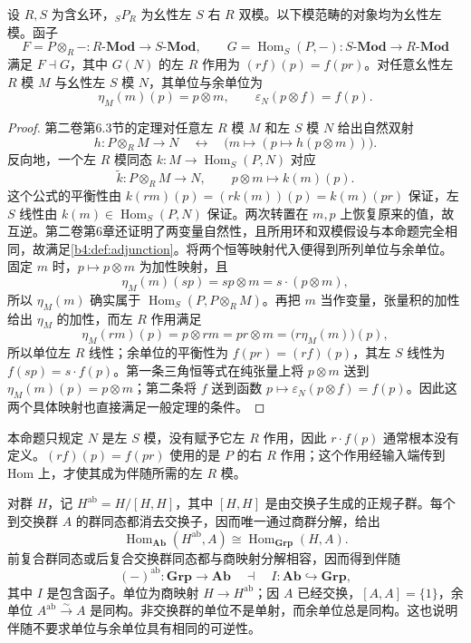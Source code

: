 \begin{proposition}\label{b4:prop:hom-tensor-adjunction}
	设 \(R,S\) 为含幺环，\({}_SP_R\) 为幺性左 \(S\) 右 \(R\) 双模。以下模范畴的对象均为幺性左模。函子
	\[
		F=P\otimes_R-:R\text{-}\mathbf{Mod}\longrightarrow S\text{-}\mathbf{Mod}, \qquad G=\operatorname{Hom}_S(P,-):S\text{-}\mathbf{Mod}\longrightarrow R\text{-}\mathbf{Mod}
	\]
	满足 \(F\dashv G\)，其中 \(G(N)\) 的左 \(R\) 作用为 \((rf)(p)=f(pr)\)。对任意幺性左 \(R\) 模 \(M\) 与幺性左 \(S\) 模 \(N\)，其单位与余单位为
	\[
		\eta_M(m)(p)=p\otimes m, \qquad \varepsilon_N(p\otimes f)=f(p).
	\]
\end{proposition}
\begin{proof}
	第二卷第6.3节的定理对任意左 \(R\) 模 \(M\) 和左 \(S\) 模 \(N\) 给出自然双射
	\[
		h:P\otimes_RM\rightarrow N \quad\longleftrightarrow\quad \bigl(m\mapsto(p\mapsto h(p\otimes m))\bigr).
	\]
	反向地，一个左 \(R\) 模同态 \(k:M\rightarrow\operatorname{Hom}_S(P,N)\) 对应
	\[
		\widetilde k:P\otimes_RM\longrightarrow N, \qquad p\otimes m\longmapsto k(m)(p).
	\]
	这个公式的平衡性由 \(k(rm)(p)=(rk(m))(p)=k(m)(pr)\) 保证，左 \(S\) 线性由 \(k(m)\in\operatorname{Hom}_S(P,N)\) 保证。两次转置在 \(m,p\) 上恢复原来的值，故互逆。第二卷第6章还证明了两变量自然性，且所用环和双模假设与本命题完全相同，故满足\cref{b4:def:adjunction}。将两个恒等映射代入便得到所列单位与余单位。固定 \(m\) 时，\(p\mapsto p\otimes m\) 为加性映射，且
	\[
		\eta_M(m)(sp)=sp\otimes m=s\cdot(p\otimes m),
	\]
	所以 \(\eta_M(m)\) 确实属于 \(\operatorname{Hom}_S(P,P\otimes_RM)\)。再把 \(m\) 当作变量，张量积的加性给出 \(\eta_M\) 的加性，而左 \(R\) 作用满足
	\[
		\eta_M(rm)(p)=p\otimes rm=pr\otimes m =\bigl(r\eta_M(m)\bigr)(p),
	\]
	所以单位左 \(R\) 线性；余单位的平衡性为 \(f(pr)=(rf)(p)\)，其左 \(S\) 线性为 \(f(sp)=s\cdot f(p)\)。第一条三角恒等式在纯张量上将 \(p\otimes m\) 送到 \(\eta_M(m)(p)=p\otimes m\)；第二条将 \(f\) 送到函数 \(p\mapsto\varepsilon_N(p\otimes f)=f(p)\)。因此这两个具体映射也直接满足一般定理的条件。
\end{proof}

本命题只规定 \(N\) 是左 \(S\) 模，没有赋予它左 \(R\) 作用，因此 \(r\cdot f(p)\) 通常根本没有定义。\((rf)(p)=f(pr)\) 使用的是 \(P\) 的右 \(R\) 作用；这个作用经输入端传到 Hom 上，才使其成为伴随所需的左 \(R\) 模。

\begin{example}[交换化与包含函子]\label{b4:exm:abelianization-adjunction}
	对群 \(H\)，记 \(H^{\mathrm{ab}}=H/[H,H]\)，其中 \([H,H]\) 是由交换子生成的正规子群。每个到交换群 \(A\) 的群同态都消去交换子，因而唯一通过商群分解，给出
	\[
		\operatorname{Hom}_{\mathbf{Ab}}(H^{\mathrm{ab}},A) \cong\operatorname{Hom}_{\mathbf{Grp}}(H,A).
	\]
	前复合群同态或后复合交换群同态都与商映射分解相容，因而得到伴随
	\[
		(-)^{\mathrm{ab}}:\mathbf{Grp}\longrightarrow\mathbf{Ab} \quad\dashv\quad I:\mathbf{Ab}\hookrightarrow\mathbf{Grp},
	\]
	其中 \(I\) 是包含函子。单位为商映射 \(H\rightarrow H^{\mathrm{ab}}\)；因 \(A\) 已经交换，\([A,A]=\{1\}\)，余单位 \(A^{\mathrm{ab}}\xrightarrow{\sim}A\) 是同构。非交换群的单位不是单射，而余单位总是同构。这也说明伴随不要求单位与余单位具有相同的可逆性。
\end{example}
